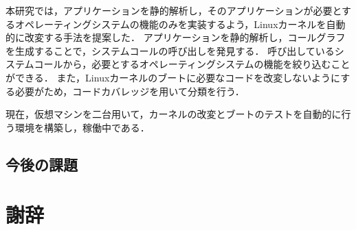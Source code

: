 \documentclass[graduation-thesis]{mlarticle}
\begin{document}
本研究では，アプリケーションを静的解析し，そのアプリケーションが必要とするオペレーティングシステムの機能のみを実装するよう，Linuxカーネルを自動的に改変する手法を提案した．
アプリケーションを静的解析し，コールグラフを生成することで，システムコールの呼び出しを発見する．
呼び出しているシステムコールから，必要とするオペレーティングシステムの機能を絞り込むことができる．
また，Linuxカーネルのブートに必要なコードを改変しないようにする必要がため，コードカバレッジを用いて分類を行う．

現在，仮想マシンを二台用いて，カーネルの改変とブートのテストを自動的に行う環境を構築し，稼働中である．

\subsection{今後の課題}

\clearpage
\section{謝辞}
\label{sec-8}
\clearpage



\end{document}
